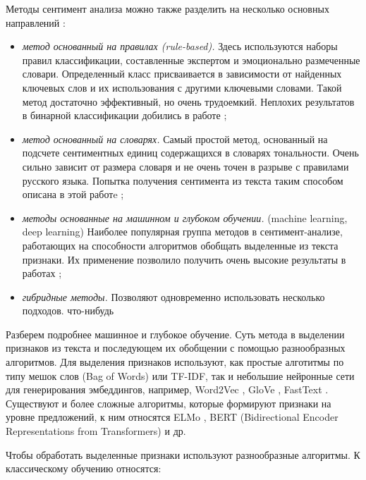 \bigskip\par
Методы сентимент анализа можно также разделить на несколько основных направлений \cite{Semina}:
\bigskip
\begin{itemize}
 \item \textit{метод основанный на правилах (rule-based).} Здесь используются наборы правил классификации, составленные экспертом и эмоционально размеченные словари. Определенный класс присваивается в зависимости от найденных ключевых слов и их использования с другими ключевыми словами. Такой метод достаточно эффективный, но
 очень трудоемкий. Неплохих результатов в бинарной классификации добились в работе \cite{atex};

 \item \textit{метод основанный на словарях.} Самый простой метод, основанный  на подсчете сентиментных единиц содержащихся в словарях тональности. Очень сильно зависит от размера словаря и не очень точен в разрыве с правилами русского языка. Попытка получения сентимента из текста таким способом описана в этой работe \cite{Kirill};

 \item \textit{методы основанные на машинном и глубоком обучении.} (machine learning, deep learning) Наиболее популярная группа методов в сентимент-анализе, работающих на способности алгоритмов обобщать выделенные из текста признаки. Их применение позволило получить очень высокие результаты в работах \cite{senti1, senti2, senti3, senti4};

 \item \textit{гибридные методы.} Позволяют одновременно использовать несколько подходов. %
что-нибудь
\end{itemize}

\bigskip\par
Разберем подробнее машинное и глубокое обучение. Суть метода в выделении признаков из текста и последующем их
обобщении с помощью разнообразных алгоритмов. Для выделения признаков используют, как простые алготитмы по
типу мешок слов (Bag of Words) или TF-IDF, так и небольшие нейронные сети для генерирования эмбеддингов,
например, Word2Vec \cite{Mikolov:1}, GloVe \cite{glove}, FastText \cite{fasttext}. Существуют и более сложные алгоритмы, которые формируют признаки на уровне предложений, к ним относятся ELMo \cite{elmo1,elmo2}, BERT (Bidirectional Encoder Representations from Transformers) \cite{bert} и др.

\bigskip\par
Чтобы обработать выделенные признаки используют разнообразные алгоритмы. К классическому обучению относятся:

